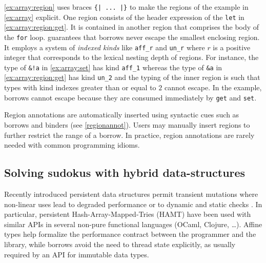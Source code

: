 \cref{ex:array:region} uses braces \lstinline/{| ... |}/ to make the
regions of the example in \cref{ex:array} explicit.  One
region consists of the header expression of the \lstinline/let/ in
\cref{ex:array:region:get}. It is contained in another region that
comprises the body of the \lstinline/for/ loop. \lang guarantees that borrows
never escape the smallest enclosing region. It employs a system of
\emph{indexed kinds} like \lstinline{aff_r} and \lstinline{un_r} where
$r$ is a positive integer that corresponds to the lexical nesting
depth of regions. For instance, the type of \lstinline{&!a} in
\cref{ex:array:set} has kind \lstinline{aff_1} whereas the type of
\lstinline{&a} in \cref{ex:array:region:get} has kind
\lstinline{un_2} and the typing of the inner region is such that types with
kind indexes greater than or equal to $2$ cannot escape.
In the example, borrows cannot escape  because they are consumed
immediately by \lstinline/get/ and \lstinline/set/.

Region annotations are automatically inserted using
syntactic cues such as borrows and binders (see
\cref{regionannot}).  Users may manually insert regions to further restrict the range of a
borrow. In practice, region annotations are
rarely needed with common programming idioms.






\subsection{Solving sudokus with hybrid data-structures}

Recently introduced persistent data structures
permit transient mutations where
non-linear uses lead to degraded performance
\cite{DBLP:conf/ml/ConchonF07} or to
dynamic and static checks \cite{DBLP:journals/pacmpl/Puente17}.
In particular, persistent Hash-Array-Mapped-Tries (HAMT) have been used with similar
APIs in several non-pure functional languages (OCaml, Clojure, \dots).
Affine types help formalize the performance contract between the programmer
and the library, while borrows avoid the need to thread state explicitly,
as usually required by an API for immutable data types.
%

